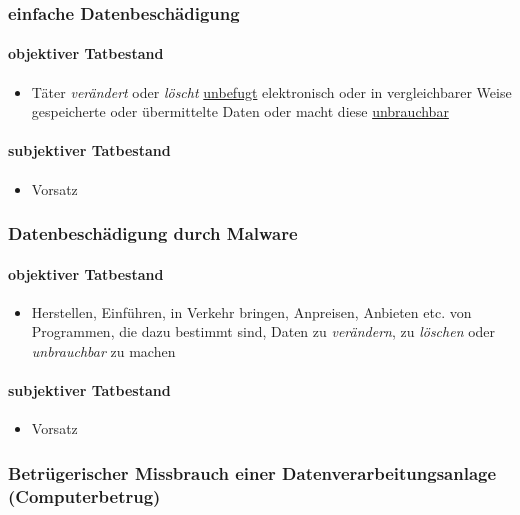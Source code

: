 \subsubsection{einfache Datenbeschädigung}

\paragraph{objektiver Tatbestand}
\begin{itemize}
    \item Täter \textit{verändert} oder \textit{löscht} \underline{unbefugt} elektronisch oder in vergleichbarer Weise gespeicherte oder übermittelte Daten oder macht diese \underline{unbrauchbar}
\end{itemize}

\paragraph{subjektiver Tatbestand}
\begin{itemize}
    \item Vorsatz
\end{itemize}

\subsubsection{Datenbeschädigung durch Malware}
\paragraph{objektiver Tatbestand}
\begin{itemize}
    \item Herstellen, Einführen, in Verkehr bringen, Anpreisen, Anbieten etc. von Programmen, die dazu bestimmt sind, Daten zu \textit{verändern}, zu \textit{löschen} oder \textit{unbrauchbar} zu
    machen
\end{itemize}

\paragraph{subjektiver Tatbestand}
\begin{itemize}
    \item Vorsatz
\end{itemize}

\subsubsection{Betrügerischer Missbrauch einer Datenverarbeitungsanlage (Computerbetrug)}
